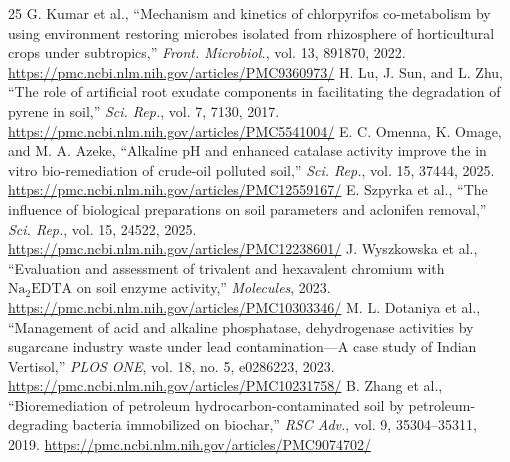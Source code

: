 \documentclass[10pt,twocolumn,a4paper]{article}
\begin{document}
\begin{thebibliography}{25}
 G. Kumar et al., ``Mechanism and kinetics of chlorpyrifos co-metabolism by using environment restoring microbes isolated from rhizosphere of horticultural crops under subtropics,'' \textit{Front. Microbiol.}, vol. 13, 891870, 2022. \url{https://pmc.ncbi.nlm.nih.gov/articles/PMC9360973/}
 H. Lu, J. Sun, and L. Zhu, ``The role of artificial root exudate components in facilitating the degradation of pyrene in soil,'' \textit{Sci. Rep.}, vol. 7, 7130, 2017. \url{https://pmc.ncbi.nlm.nih.gov/articles/PMC5541004/}
 E. C. Omenna, K. Omage, and M. A. Azeke, ``Alkaline pH and enhanced catalase activity improve the in vitro bio-remediation of crude-oil polluted soil,'' \textit{Sci. Rep.}, vol. 15, 37444, 2025. \url{https://pmc.ncbi.nlm.nih.gov/articles/PMC12559167/}
 E. Szpyrka et al., ``The influence of biological preparations on soil parameters and aclonifen removal,'' \textit{Sci. Rep.}, vol. 15, 24522, 2025. \url{https://pmc.ncbi.nlm.nih.gov/articles/PMC12238601/}
 J. Wyszkowska et al., ``Evaluation and assessment of trivalent and hexavalent chromium with $\mathrm{Na_2EDTA}$ on soil enzyme activity,'' \textit{Molecules}, 2023. \url{https://pmc.ncbi.nlm.nih.gov/articles/PMC10303346/}
 M. L. Dotaniya et al., ``Management of acid and alkaline phosphatase, dehydrogenase activities by sugarcane industry waste under lead contamination---A case study of Indian Vertisol,'' \textit{PLOS ONE}, vol. 18, no. 5, e0286223, 2023. \url{https://pmc.ncbi.nlm.nih.gov/articles/PMC10231758/}
 B. Zhang et al., ``Bioremediation of petroleum hydrocarbon-contaminated soil by petroleum-degrading bacteria immobilized on biochar,'' \textit{RSC Adv.}, vol. 9, 35304--35311, 2019. \url{https://pmc.ncbi.nlm.nih.gov/articles/PMC9074702/}
\end{thebibliography}
\end{document}
